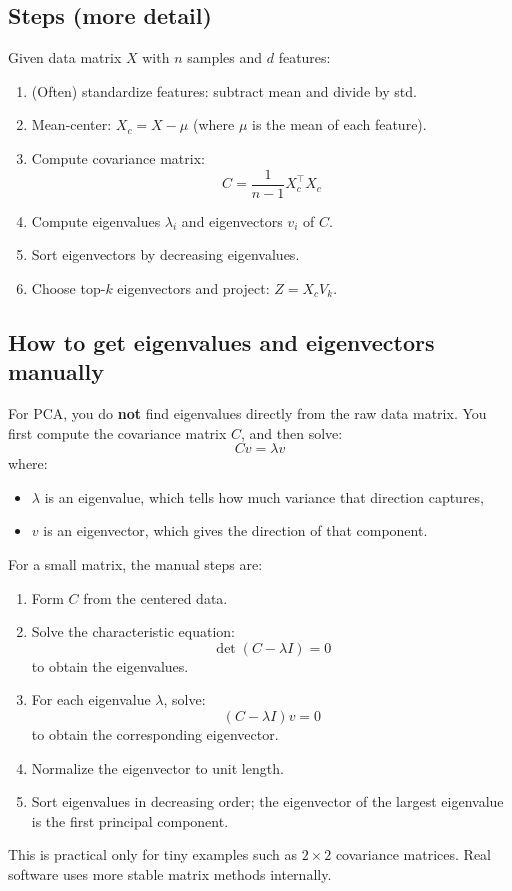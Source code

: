 \documentclass[11pt]{article}
\begin{document}
\subsection{Steps (more detail)}
Given data matrix $X$ with $n$ samples and $d$ features:
\begin{enumerate}[leftmargin=*]
  \item (Often) standardize features: subtract mean and divide by std.
  \item Mean-center: $X_c = X - \mu$ (where $\mu$ is the mean of each feature).
  \item Compute covariance matrix:
  \[
    C = \frac{1}{n-1} X_c^\top X_c
  \]
  \item Compute eigenvalues $\lambda_i$ and eigenvectors $v_i$ of $C$.
  \item Sort eigenvectors by decreasing eigenvalues.
  \item Choose top-$k$ eigenvectors and project: $Z = X_c V_k$.
\end{enumerate}

\subsection{How to get eigenvalues and eigenvectors manually}
For PCA, you do \textbf{not} find eigenvalues directly from the raw data matrix.
You first compute the covariance matrix $C$, and then solve:
\[
  C v = \lambda v
\]
where:
\begin{itemize}[leftmargin=*]
  \item $\lambda$ is an eigenvalue, which tells how much variance that direction captures,
  \item $v$ is an eigenvector, which gives the direction of that component.
\end{itemize}

For a small matrix, the manual steps are:
\begin{enumerate}[leftmargin=*]
  \item Form $C$ from the centered data.
  \item Solve the characteristic equation:
  \[
    \det(C - \lambda I)=0
  \]
  to obtain the eigenvalues.
  \item For each eigenvalue $\lambda$, solve:
  \[
    (C-\lambda I)v=0
  \]
  to obtain the corresponding eigenvector.
  \item Normalize the eigenvector to unit length.
  \item Sort eigenvalues in decreasing order; the eigenvector of the largest eigenvalue is the first principal component.
\end{enumerate}
This is practical only for tiny examples such as $2 \times 2$ covariance matrices. Real software uses more stable matrix methods internally.
\end{document}
